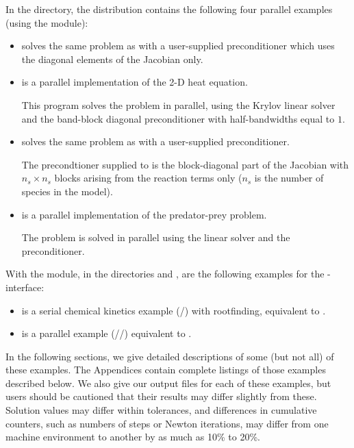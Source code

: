 In the  directory, the {\ida} 
distribution contains the following four parallel examples 
(using the {\nvecp} module):
\begin{itemize}

\item {}
  solves the same problem as  with a user-supplied preconditioner
  which uses the diagonal elements of the Jacobian only.
  
\item {}
  is a parallel implementation of the 2-D heat equation.

  This program solves the problem in parallel, using the Krylov linear solver
  {\idaspgmr} and the band-block diagonal preconditioner {\idabbdpre} with
  half-bandwidths equal to $1$.

\item {}
  solves the same problem as  with a user-supplied preconditioner.
  
  The precondtioner supplied to {\idaspgmr} is the block-diagonal part of 
  the Jacobian with $n_s \times n_s$ blocks arising from the reaction terms only
  ($n_s$ is the number of species in the model).

\item {}
  is a parallel implementation of the predator-prey problem.

  The problem is solved in parallel using the {\idaspgmr} linear
  solver and the {\idabbdpre} preconditioner.

\end{itemize}

With the {\fida} module, in the directories 
 and
\newline {}, are the following
examples for the {\F}-{\C} interface:
%
\begin{itemize}
\item {} is a serial chemical kinetics example (/{\dense})
       with rootfinding, equivalent to .

\item {} is a parallel example (/{\spgmr}/{\idabbdpre})
       equivalent to .

\end{itemize}

\vspace{0.2in}\noindent 
In the following sections, we give detailed descriptions of some (but
not all) of these examples.  The Appendices contain complete listings
of those examples described below.  We also give our output files for
each of these examples, but users should be cautioned that their
results may differ slightly from these.  Solution
values may differ within tolerances, and differences in cumulative
counters, such as numbers of steps or Newton iterations, may differ
from one machine environment to another by as much as 10\% to 20\%.

